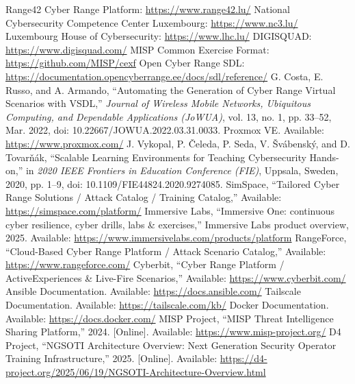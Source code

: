 \documentclass[11pt]{article}
\begin{document}

\begin{thebibliography}{99}
 Range42 Cyber Range Platform: \url{https://www.range42.lu/}
 National Cybersecurity Competence Center Luxembourg: \url{https://www.nc3.lu/}
 Luxembourg House of Cybersecurity: \url{https://www.lhc.lu/}
 DIGISQUAD: \url{https://www.digisquad.com/}
 MISP Common Exercise Format: \url{https://github.com/MISP/cexf}
 Open Cyber Range SDL: \url{https://documentation.opencyberrange.ee/docs/sdl/reference/}
 G. Costa, E. Russo, and A. Armando, 
``Automating the Generation of Cyber Range Virtual Scenarios with VSDL,'' 
\textit{Journal of Wireless Mobile Networks, Ubiquitous Computing, and Dependable Applications (JoWUA)}, 
vol. 13, no. 1, pp. 33--52, Mar. 2022, 
doi: 10.22667/JOWUA.2022.03.31.0033.
 Proxmox VE. Available: \url{https://www.proxmox.com/}
 J. Vykopal, P. Čeleda, P. Seda, V. Švábenský, and D. Tovarňák,
``Scalable Learning Environments for Teaching Cybersecurity Hands-on,''
in \textit{2020 IEEE Frontiers in Education Conference (FIE)},
Uppsala, Sweden, 2020, pp. 1--9, doi: 10.1109/FIE44824.2020.9274085.
 SimSpace, “Tailored Cyber Range Solutions / Attack Catalog / Training Catalog,”  Available: \url{https://simspace.com/platform/}  
 Immersive Labs, “Immersive One: continuous cyber resilience, cyber drills, labs \& exercises,” Immersive Labs product overview, 2025. Available: \url{https://www.immersivelabs.com/products/platform}  
 RangeForce, “Cloud-Based Cyber Range Platform / Attack Scenario Catalog,” Available: \url{https://www.rangeforce.com/}
 Cyberbit, “Cyber Range Platform / ActiveExperiences \& Live-Fire Scenarios,” Available: \url{https://www.cyberbit.com/}
 Ansible Documentation. Available: \url{https://docs.ansible.com/}
 Tailscale Documentation. Available: \url{https://tailscale.com/kb/}
 Docker Documentation. Available: \url{https://docs.docker.com/}
 MISP Project, ``MISP Threat Intelligence Sharing Platform,'' 2024. [Online]. Available: \url{https://www.misp-project.org/}
 D4 Project, ``NGSOTI Architecture Overview: Next Generation Security Operator Training Infrastructure,'' 2025. [Online]. Available: \url{https://d4-project.org/2025/06/19/NGSOTI-Architecture-Overview.html}
\end{thebibliography}
\end{document}
